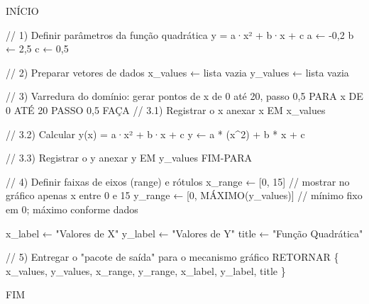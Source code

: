 \documentclass[
  portuguese,
  letterpaper,
  DIV=11,
  numbers=noendperiod]{scrreprt}
\newenvironment{Shaded}{\begin{snugshade}}{\end{snugshade}}
\newcommand{\DecValTok}[1]{\textcolor[rgb]{0.68,0.00,0.00}{#1}}
\newcommand{\ErrorTok}[1]{\textcolor[rgb]{0.68,0.00,0.00}{#1}}
\newcommand{\FloatTok}[1]{\textcolor[rgb]{0.68,0.00,0.00}{#1}}
\newcommand{\FunctionTok}[1]{\textcolor[rgb]{0.28,0.35,0.67}{#1}}
\newcommand{\NormalTok}[1]{\textcolor[rgb]{0.00,0.23,0.31}{#1}}
\newcommand{\OtherTok}[1]{\textcolor[rgb]{0.00,0.23,0.31}{#1}}
\newcommand{\SpecialCharTok}[1]{\textcolor[rgb]{0.37,0.37,0.37}{#1}}
\newcommand{\StringTok}[1]{\textcolor[rgb]{0.13,0.47,0.30}{#1}}
\begin{document}
\begin{Shaded}
\begin{Highlighting}[]
\NormalTok{INÍCIO}

\SpecialCharTok{/}\ErrorTok{/} \DecValTok{1}\ErrorTok{)}\NormalTok{ Definir parâmetros da função quadrática y }\OtherTok{=}\NormalTok{ a·x² }\SpecialCharTok{+}\NormalTok{ b·x }\SpecialCharTok{+}\NormalTok{ c}
\NormalTok{a ← }\SpecialCharTok{{-}}\DecValTok{0}\NormalTok{,}\DecValTok{2}
\NormalTok{b ←  }\DecValTok{2}\NormalTok{,}\DecValTok{5}
\NormalTok{c ←  }\DecValTok{0}\NormalTok{,}\DecValTok{5}

\SpecialCharTok{/}\ErrorTok{/} \DecValTok{2}\ErrorTok{)}\NormalTok{ Preparar vetores de dados}
\NormalTok{x\_values ← lista vazia}
\NormalTok{y\_values ← lista vazia}

\SpecialCharTok{/}\ErrorTok{/} \DecValTok{3}\ErrorTok{)}\NormalTok{ Varredura do domínio}\SpecialCharTok{:}\NormalTok{ gerar pontos de x de }\DecValTok{0}\NormalTok{ até }\DecValTok{20}\NormalTok{, passo }\DecValTok{0}\NormalTok{,}\DecValTok{5}
\NormalTok{PARA x DE }\DecValTok{0}\NormalTok{ ATÉ }\DecValTok{20}\NormalTok{ PASSO }\DecValTok{0}\NormalTok{,}\DecValTok{5}\NormalTok{ FAÇA}
    \SpecialCharTok{/}\ErrorTok{/} \FloatTok{3.1}\ErrorTok{)}\NormalTok{ Registrar o x}
\NormalTok{    anexar x EM x\_values}

    \SpecialCharTok{/}\ErrorTok{/} \FloatTok{3.2}\ErrorTok{)}\NormalTok{ Calcular }\FunctionTok{y}\NormalTok{(x) }\OtherTok{=}\NormalTok{ a·x² }\SpecialCharTok{+}\NormalTok{ b·x }\SpecialCharTok{+}\NormalTok{ c}
\NormalTok{    y ← a }\SpecialCharTok{*}\NormalTok{ (x}\SpecialCharTok{\^{}}\DecValTok{2}\NormalTok{) }\SpecialCharTok{+}\NormalTok{ b }\SpecialCharTok{*}\NormalTok{ x }\SpecialCharTok{+}\NormalTok{ c}

    \SpecialCharTok{/}\ErrorTok{/} \FloatTok{3.3}\ErrorTok{)}\NormalTok{ Registrar o y}
\NormalTok{    anexar y EM y\_values}
\NormalTok{FIM}\SpecialCharTok{{-}}\NormalTok{PARA}

\SpecialCharTok{/}\ErrorTok{/} \DecValTok{4}\ErrorTok{)}\NormalTok{ Definir faixas de }\FunctionTok{eixos}\NormalTok{ (range) e rótulos}
\NormalTok{x\_range ← [}\DecValTok{0}\NormalTok{, }\DecValTok{15}\NormalTok{]               }\SpecialCharTok{/}\ErrorTok{/}\NormalTok{ mostrar no gráfico apenas x entre }\DecValTok{0}\NormalTok{ e }\DecValTok{15}
\NormalTok{y\_range ← [}\DecValTok{0}\NormalTok{, MÁXIMO(y\_values)] }\SpecialCharTok{/}\ErrorTok{/}\NormalTok{ mínimo fixo em }\DecValTok{0}\NormalTok{; máximo conforme dados}

\NormalTok{x\_label ← }\StringTok{"Valores de X"}
\NormalTok{y\_label ← }\StringTok{"Valores de Y"}
\NormalTok{title   ← }\StringTok{"Função Quadrática"}

\SpecialCharTok{/}\ErrorTok{/} \DecValTok{5}\ErrorTok{)}\NormalTok{ Entregar o }\StringTok{"pacote de saída"}\NormalTok{ para o mecanismo gráfico}
\NormalTok{RETORNAR \{}
\NormalTok{  x\_values, y\_values,}
\NormalTok{  x\_range, y\_range,}
\NormalTok{  x\_label, y\_label,}
\NormalTok{  title}
\NormalTok{\}}

\NormalTok{FIM}
\end{Highlighting}
\end{Shaded}
\end{document}
